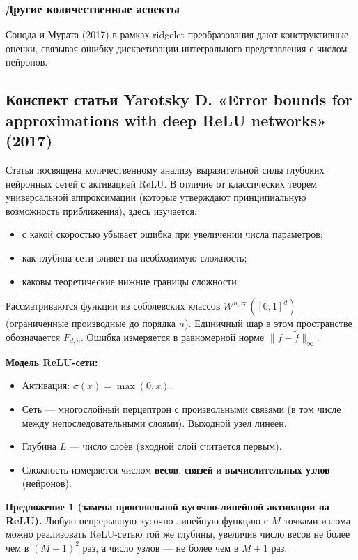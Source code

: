 \documentclass[12pt]{article}
\begin{document}
	\subsubsection*{Другие количественные аспекты}
	
	Сонода и Мурата (2017) в рамках ridgelet-преобразования дают конструктивные оценки, связывая ошибку дискретизации интегрального представления с числом нейронов.
	
	\subsection{Конспект статьи Yarotsky D. «Error bounds for approximations with deep ReLU networks» (2017)}
	
	Статья посвящена количественному анализу выразительной силы глубоких нейронных сетей с активацией ReLU. В отличие от классических теорем универсальной аппроксимации (которые утверждают принципиальную возможность приближения), здесь изучается:
	\begin{itemize}
		\item с какой скоростью убывает ошибка при увеличении числа параметров;
		\item как глубина сети влияет на необходимую сложность;
		\item каковы теоретические нижние границы сложности.
	\end{itemize}
	Рассматриваются функции из соболевских классов \(\mathcal{W}^{n,\infty}([0,1]^d)\) (ограниченные производные до порядка \(n\)). Единичный шар в этом пространстве обозначается \(F_{d,n}\). Ошибка измеряется в равномерной норме \vspace{5mm} \(\|f-\tilde f\|_\infty\).
	
	\textbf{Модель ReLU-сети:}
	
	\begin{itemize}
		\item Активация: \(\sigma(x)=\max(0,x)\).
		\item Сеть — многослойный перцептрон с произвольными связями (в том числе между непоследовательными слоями). Выходной узел линеен.
		\item Глубина \(L\) — число слоёв (входной слой считается первым).
		\item Сложность измеряется числом \textbf{весов}, \textbf{связей} и \textbf{вычислительных узлов} (нейронов).
	\end{itemize}
	
	\textbf{Предложение 1 (замена произвольной кусочно-линейной активации на ReLU).}  
	Любую непрерывную кусочно-линейную функцию с \(M\) точками излома можно реализовать ReLU-сетью той же глубины, увеличив число весов не более чем в \((M+1)^2\) раз, а число узлов — не более чем в \(M+1\) раз.
	
\end{document}
